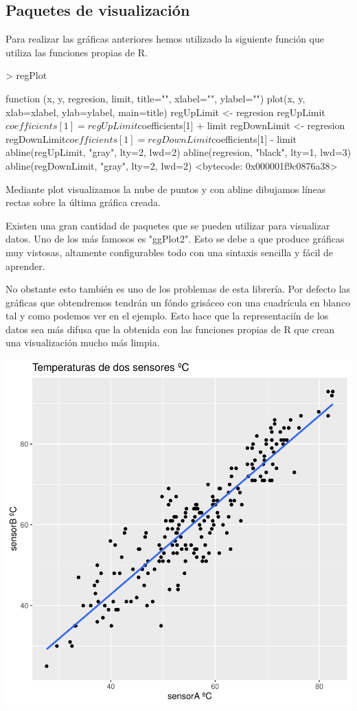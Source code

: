 \documentclass [a4paper] {article}
\begin{document}
\subsection{Paquetes de visualización}
Para realizar las gráficas anteriores hemos utilizado la siguiente función que utiliza las funciones propias de R.
\begin{Schunk}
\begin{Sinput}
> regPlot
\end{Sinput}
\begin{Soutput}
function (x, y, regresion, limit, title="", xlabel="", ylabel="") {
  plot(x, y, xlab=xlabel, ylab=ylabel, main=title)
  regUpLimit <- regresion
  regUpLimit$coefficients[1] = regUpLimit$coefficients[1] + limit
  regDownLimit <- regresion
  regDownLimit$coefficients[1] = regDownLimit$coefficients[1] - limit
  abline(regUpLimit, "gray", lty=2, lwd=2)
  abline(regresion, "black", lty=1, lwd=3)
  abline(regDownLimit, "gray", lty=2, lwd=2)
}
<bytecode: 0x000001f9c0876a38>
\end{Soutput}
\end{Schunk}
Mediante plot visualizamos la nube de puntos y con abline dibujamos líneas rectas sobre la última gráfica creada.

Existen una gran cantidad de paquetes que se pueden utilizar para visualizar datos.
Uno de los más famosos es "ggPlot2".
Esto se debe a que produce gráficas muy vistosas, altamente configurables todo con una sintaxis sencilla y fácil de aprender.

No obstante esto también es uno de los problemas de esta librería.
Por defecto las gráficas que obtendremos tendrán un fóndo grisáceo con una cuadrícula en blanco tal y como podemos ver en el ejemplo.
Esto hace que la representaciín de los datos sea más difusa que la obtenida con las funciones propias de R que crean una visualización mucho más limpia.
\begin{center}
\includegraphics{entrega-ggplot2_NO_se}
\end{center}
\end{document}
